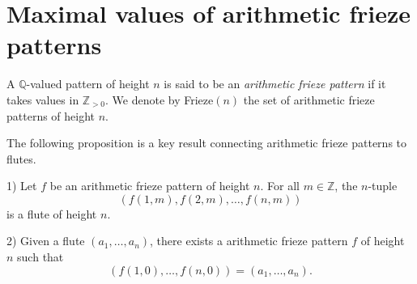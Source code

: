 \chapter{Maximal values of arithmetic frieze patterns}\label{s:arith_fp}
\begin{definition}
    \label{def:arith_fp}
    \leanok
        A $\mathbb{Q}$-valued pattern of height $n$ is said to be an \textit{arithmetic frieze pattern} if it takes 
        values in $\mathbb{Z}_{>0}$. 
        We denote by Frieze$(n)$ the set of arithmetic frieze patterns of height $n$. 
\end{definition}

The following proposition is a key result connecting arithmetic frieze patterns to flutes.
\begin{proposition}
    \label{prop:friezeIffFlute}
1) Let $f$ be an arithmetic frieze pattern of height $n$. For all $m \in \mathbb{Z}$, the $n$-tuple
\[
    (f (1,m), f (2,m), \ldots, f (n,m))
\]
is a flute of height $n$.

2) Given a flute $(a_1, \ldots, a_n)$, there exists a arithmetic frieze pattern $f$ of height $n$ such that
\[
    (f (1,0), \ldots, f (n,0)) = (a_1, \ldots, a_n).
\]
\end{proposition}
